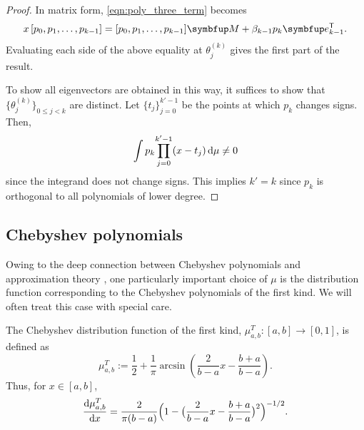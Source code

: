 \begin{proof}
    In matrix form, \cref{eqn:poly_three_term} becomes
    \begin{equation*}
        x\, [p_0, p_1, \ldots, p_{k-1} ] = [p_0, p_1, \ldots, p_{k-1}] \vec{M} + \beta_{k-1} p_{k} \vec{e}_{k-1}^\rT.
    \end{equation*}
    Evaluating each side of the above equality at \( \theta_j^{(k)} \) gives the first part of the result.

    To show all eigenvectors are obtained in this way, it suffices to show that \( \{ \theta_j^{(k)} \}_{0\leq j<k} \) are distinct.
    Let \( \{ t_j \}_{j=0}^{k'-1} \) be the points at which \( p_{k} \) changes signs. 
    Then, 
    \begin{equation*}
        \int p_k {\prod_{j=0}^{k'-1}} (x-t_j) \,\textup{d} \mu \neq 0
    \end{equation*}
    since the integrand does not change signs.
    This implies \( k' = k \) since \( p_k \) is orthogonal to all polynomials of lower degree.
\end{proof}





\subsection{Chebyshev polynomials}

Owing to the deep connection between Chebyshev polynomials and approximation theory \cite{trefethen_19}, one particularly important choice of \( \mu \) is the distribution function corresponding to the Chebyshev polynomials of the first kind. 
We will often treat this case with special care.
\begin{definition}
    \label{def:muT}
    The Chebyshev distribution function of the first kind, \( \mu_{a,b}^T : [a,b] \to [0,1] \), is defined as
    \begin{equation*}
        \mu_{a,b}^T 
        := \frac{1}{2} + \frac{1}{\pi}\arcsin\left(\frac{2}{b-a}x - \frac{b+a}{b-a}\right).
    \end{equation*}
    Thus, for \( x\in[a,b] \),
    \begin{equation*}
        \frac{\textup{d}\mu_{a,b}^T}{\textup{d}{x}}
        = \frac{2}{\pi(b-a)} \Big(1-\big(\frac{2}{b-a}x - \frac{b+a}{b-a}\big)^2\Big)^{-1/2}.
    \end{equation*}    
\end{definition}

